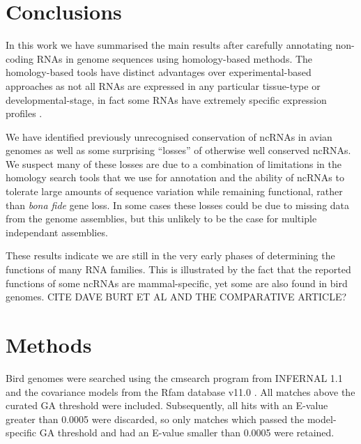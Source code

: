 \documentclass[10pt]{bmc_article}
\newenvironment{bmcformat}{\begin{raggedright}\baselineskip20pt\sloppy\setboolean{publ}{false}}{\end{raggedright}\baselineskip20pt\sloppy}
\begin{document}
\begin{bmcformat}
\section*{Conclusions}


In this work we have summarised the main results after carefully
annotating non-coding RNAs in genome sequences using homology-based
methods. The homology-based tools have distinct advantages over
experimental-based approaches as not all RNAs are expressed in any
particular tissue-type or developmental-stage, in fact some RNAs have
extremely specific expression profiles \cite{Johnston:2003}.

 We have identified previously unrecognised conservation of
ncRNAs in avian genomes as well as some surprising ``losses'' of
otherwise well conserved ncRNAs. We suspect many of these losses are
due to a combination of limitations in the homology search tools that
we use for annotation and the ability of ncRNAs to tolerate large
amounts of sequence variation while remaining functional, rather than
\emph{bona fide} gene loss. In some cases these losses could be due to
missing data from the genome assemblies, but this unlikely to be the
case for multiple independant assemblies.

These results indicate we are still in the very early phases of
determining the functions of many RNA families. This is illustrated by
the fact that the reported functions of some ncRNAs are
mammal-specific, yet some are also found in bird genomes. CITE DAVE
BURT ET AL AND THE COMPARATIVE ARTICLE?

\section*{Methods}

Bird genomes were searched using the cmsearch program from INFERNAL
1.1 and the covariance models from the Rfam database
v11.0 \cite{Gardner:2011a,Burge:2013}. All matches above the curated GA
threshold were included. Subsequently, all hits with an E-value
greater than 0.0005 were discarded, so only matches which passed the
model-specific GA threshold and had an E-value smaller than 0.0005
were retained. 


\end{bmcformat}
\end{document}
